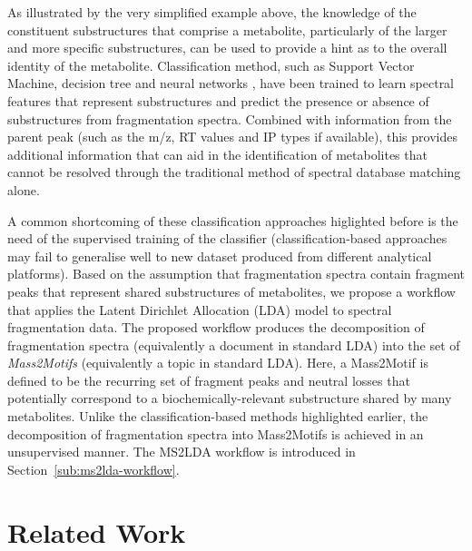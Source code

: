 As illustrated by the very simplified example above, the knowledge of the constituent substructures that comprise a metabolite, particularly of the larger and more specific substructures, can be used to provide a hint as to the overall identity of the metabolite. Classification method, such as Support Vector Machine, decision tree and neural networks \cite{Varmuza1996,Hummel2010,Heinonen2012a,Duhrkop2015}, have been trained to learn spectral features that represent substructures and predict the presence or absence of substructures from fragmentation spectra. Combined with information from the parent peak (such as the m/z, RT values and IP types if available), this provides additional information that can aid in the identification of metabolites that cannot be resolved through the traditional method of spectral database matching alone.

A common shortcoming of these classification approaches higlighted before is the need of the supervised training of the classifier (classification-based approaches may fail to generalise well to new dataset produced from different analytical platforms). Based on the assumption that fragmentation spectra contain fragment peaks that represent shared substructures of metabolites, we propose a workflow that applies the Latent Dirichlet Allocation (LDA) model to spectral fragmentation data. The proposed workflow produces the decomposition of fragmentation spectra (equivalently a document in standard LDA) into the set of \textit{Mass2Motifs} (equivalently a topic in standard LDA). Here, a Mass2Motif is defined to be the recurring set of fragment peaks and neutral losses that potentially correspond to a biochemically-relevant substructure shared by many metabolites. Unlike the classification-based methods highlighted earlier, the decomposition of fragmentation spectra into Mass2Motifs is achieved in an unsupervised manner. The MS2LDA workflow is introduced in Section~\ref{sub:ms2lda-workflow}.

\section{Related Work}

